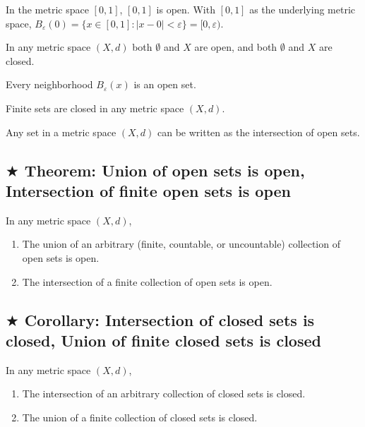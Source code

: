 \documentclass[11pt]{elegantbook}
\begin{document}
\begin{example}
    In the metric space $[0, 1]$, $[0, 1]$ is open. With $[0, 1]$ as the underlying metric space, $B_\varepsilon(0) = \{x \in [0, 1] : |x - 0| < \varepsilon\} = [0,\varepsilon)$.
\end{example}

\begin{theorem}
    In any metric space $(X, d)$ both $\emptyset$ and $X$ are open, and both $\emptyset$ and $X$ are closed.
\end{theorem}

\begin{theorem}
    Every neighborhood $B_\varepsilon(x)$ is an open set.
\end{theorem}

\begin{theorem}
    Finite sets are closed in any metric space $(X, d)$.
\end{theorem}

\begin{proposition}
    Any set in a metric space $(X, d)$ can be written as the intersection of open sets.
\end{proposition}

\subsection{$\bigstar$ Theorem: Union of open sets is open, Intersection of finite open sets is open}
\begin{theorem}
    In any metric space $(X, d)$,
    \begin{enumerate}
        \item The union of an arbitrary (finite, countable, or uncountable) collection of open sets is open.
        \item The intersection of a finite collection of open sets is open.
    \end{enumerate}
\end{theorem}

\subsection{$\bigstar$ Corollary: Intersection of closed sets is closed, Union of finite closed sets is closed}
\begin{corollary}
    In any metric space $(X, d)$,
    \begin{enumerate}
        \item The intersection of an arbitrary collection of closed sets is closed.
        \item The union of a finite collection of closed sets is closed.
    \end{enumerate}
\end{corollary}
\end{document}
